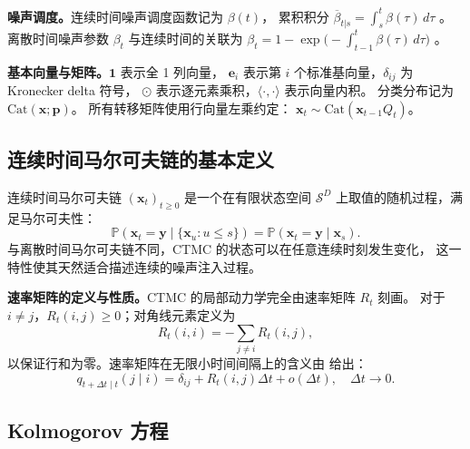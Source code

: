 \documentclass[12pt,a4paper]{ctexbook}
\theoremstyle{definition}
\begin{document}
\textbf{噪声调度。}连续时间噪声调度函数记为 $\beta(t)$，
累积积分 $\overline{\beta}_{t|s} = \int_s^t \beta(\tau) \, d\tau$
\cite[§2.1]{zhao2025ud3}。
离散时间噪声参数 $\beta_t$ 与连续时间的关联为
$\beta_t = 1 - \exp\bigl(-\int_{t-1}^t \beta(\tau)\,d\tau\bigr)$
\cite[§4.1]{campbell2022ctmc}。

\textbf{基本向量与矩阵。}$\mathbf{1}$ 表示全 1 列向量，
$\mathbf{e}_i$ 表示第 $i$ 个标准基向量，$\delta_{ij}$ 为 Kronecker delta 符号，
$\odot$ 表示逐元素乘积，$\langle \cdot, \cdot \rangle$ 表示向量内积。
分类分布记为 $\text{Cat}(\boldsymbol{x}; \boldsymbol{p})$。
所有转移矩阵使用行向量左乘约定：
$\boldsymbol{x}_t \sim \text{Cat}(\boldsymbol{x}_{t-1} Q_t)$。

\subsection{连续时间马尔可夫链的基本定义}

连续时间马尔可夫链 $(\boldsymbol{x}_t)_{t \ge 0}$ 是一个在有限状态空间 $\mathcal{S}^D$ 上取值的随机过程，满足马尔可夫性：
\begin{equation}
\mathbb{P}(\boldsymbol{x}_t = \boldsymbol{y} \mid \{\boldsymbol{x}_u : u \le s\}) = \mathbb{P}(\boldsymbol{x}_t = \boldsymbol{y} \mid \boldsymbol{x}_s). \label{eq:markov-property}
\end{equation}
与离散时间马尔可夫链不同，CTMC 的状态可以在任意连续时刻发生变化，
这一特性使其天然适合描述连续的噪声注入过程。

\textbf{速率矩阵的定义与性质。}CTMC 的局部动力学完全由速率矩阵 $R_t$ 刻画。
对于 $i \neq j$，$R_t(i, j) \ge 0$；对角线元素定义为
\begin{equation}
R_t(i, i) = -\sum_{j \neq i} R_t(i, j), \label{eq:rate-diagonal}
\end{equation}
以保证行和为零。速率矩阵在无限小时间间隔上的含义由 \cite[§3.1]{campbell2022ctmc} 给出：
\begin{equation}
q_{t+\Delta t \mid t}(j \mid i) = \delta_{ij} + R_t(i, j) \Delta t + o(\Delta t), \quad \Delta t \to 0. \label{eq:infinitesimal}
\end{equation}

\subsection{Kolmogorov 方程}
\end{document}
